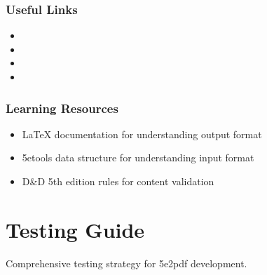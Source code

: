 \documentclass[letterpaper,10pt,english]{sphinxmanual}
\begin{document}
\subsubsection{Useful Links}
\label{\detokenize{developer/contributing:useful-links}}\begin{itemize}
\item {} 
\sphinxAtStartPar
{}

\item {} 
\sphinxAtStartPar
{}

\item {} 
\sphinxAtStartPar
{}

\item {} 
\sphinxAtStartPar
{}

\end{itemize}


\subsubsection{Learning Resources}
\label{\detokenize{developer/contributing:learning-resources}}\begin{itemize}
\item {} 
\sphinxAtStartPar
LaTeX documentation for understanding output format

\item {} 
\sphinxAtStartPar
5etools data structure for understanding input format

\item {} 
\sphinxAtStartPar
D\&D 5th edition rules for content validation

\end{itemize}

\sphinxstepscope


\section{Testing Guide}
\label{\detokenize{developer/testing:testing-guide}}\label{\detokenize{developer/testing::doc}}
\sphinxAtStartPar
Comprehensive testing strategy for 5e2pdf development.
\end{document}
